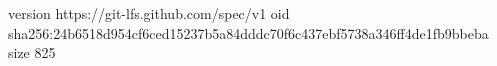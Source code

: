 version https://git-lfs.github.com/spec/v1
oid sha256:24b6518d954cf6ced15237b5a84dddc70f6c437ebf5738a346ff4de1fb9bbeba
size 825
